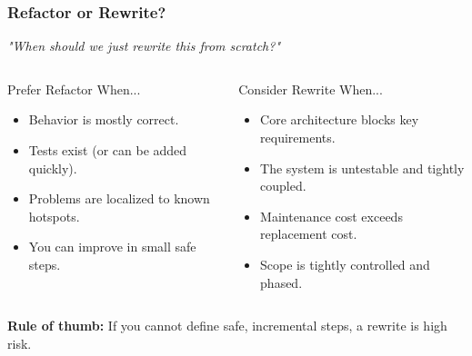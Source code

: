 \documentclass[xcolor=table]{beamer}
\begin{document}
\begin{frame}
    \frametitle{Refactor or Rewrite?}
    \textit{"When should we just rewrite this from scratch?"}

    \vspace{0.1cm}
    \begin{columns}[T]
        \begin{block}{Prefer Refactor When...}
            \begin{itemize}
                \item Behavior is mostly correct.
                \item Tests exist (or can be added quickly).
                \item Problems are localized to known hotspots.
                \item You can improve in small safe steps.
            \end{itemize}
        \end{block}

        \begin{alertblock}{Consider Rewrite When...}
            \begin{itemize}
                \item Core architecture blocks key requirements.
                \item The system is untestable and tightly coupled.
                \item Maintenance cost exceeds replacement cost.
                \item Scope is tightly controlled and phased.
            \end{itemize}
        \end{alertblock}
    \end{columns}

    \vspace{0.1cm}
    \textbf{Rule of thumb:} If you cannot define safe, incremental steps, a rewrite is high risk.
\end{frame}
\end{document}
